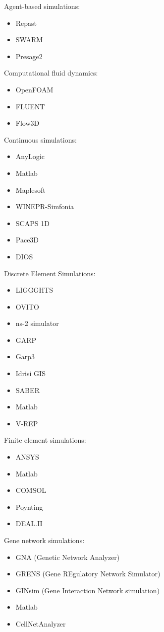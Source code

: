 \documentclass[utf8]{gradu3}
\begin{document}
Agent-based simulations:
\begin{itemize}[noitemsep, topsep=0pt]
    \item Repast
    \item SWARM
    \item Presage2
\end{itemize}

Computational fluid dynamics:
\begin{itemize}
    \item OpenFOAM
    \item FLUENT
    \item Flow3D
\end{itemize}

Continuous simulations:
\begin{itemize}
    \item AnyLogic
    \item Matlab
    \item Maplesoft
    \item WINEPR-Simfonia
    \item SCAPS 1D
    \item Pace3D
    \item DIOS
\end{itemize}

Discrete Element Simulations:
\begin{itemize}
    \item LIGGGHTS 
    \item OVITO
    \item ns-2 simulator
    \item GARP
    \item Garp3
    \item Idrisi GIS
    \item SABER
    \item Matlab
    \item V-REP
\end{itemize}

Finite element simulations:
\begin{itemize}
    \item ANSYS
    \item Matlab
    \item COMSOL
    \item Poynting
    \item DEAL.II
\end{itemize}

Gene network simulations:
\begin{itemize}
    \item GNA (Genetic Network Analyzer) 
    \item GRENS (Gene REgulatory Network Simulator)
    \item GINsim (Gene Interaction Network simulation)
    \item Matlab
    \item CellNetAnalyzer
\end{itemize}
\end{document}
